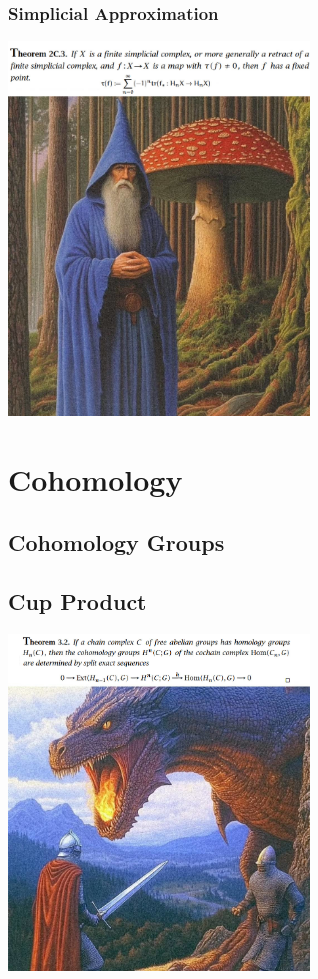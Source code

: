 \documentclass[11pt, a4paper, final]{amsart}
\numberwithin{theorem}{section}
\theoremstyle{definition}
\theoremstyle{remark}
\begin{document}
\subsubsection{Simplicial Approximation}

\begin{center}
    \includegraphics[width=80mm]{images/lefschetz_number.jpg}
\end{center}

\section{Cohomology}
\subsection{Cohomology Groups}
\subsection{Cup Product}

\begin{center}
    \includegraphics[width=80mm]{images/cohomology_coefficients.jpg}
\end{center}
\end{document}
